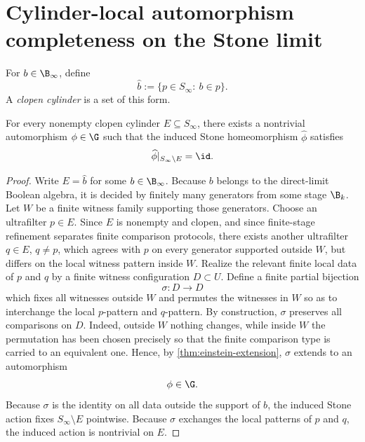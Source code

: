 \section{Cylinder-local automorphism completeness on the Stone limit}
\label{sec:einstein-cylinder}
\begin{definition}
	For \(b\in \B_\infty\), define
	\[
		\widehat b:=\{p\in S_\infty:\ b\in p\}.
	\]
	A \emph{clopen cylinder} is a set of this form.
\end{definition}
\begin{theorem}
	\label{thm:einstein-cylinder}
	For every nonempty clopen cylinder \(E\subseteq S_\infty\), there
	exists a nontrivial automorphism \(\phi\in\G\) such that the induced
	Stone homeomorphism \(\widehat\phi\) satisfies
	\[
		\widehat\phi|_{S_\infty\setminus E}=\id.
	\]
\end{theorem}
\begin{proof}
	Write \(E=\widehat b\) for some \(b\in \B_\infty\).
	Because \(b\) belongs to the direct-limit Boolean algebra, it is
	decided by finitely many generators from some stage \(\B_k\).
	Let \(W\) be a finite witness family supporting those generators.
	Choose an ultrafilter \(p\in E\).
	Since \(E\) is nonempty and clopen, and since finite-stage refinement
	separates finite comparison protocols, there exists another ultrafilter
	\(q\in E\), \(q\neq p\), which agrees with \(p\) on every generator
	supported outside \(W\), but differs on the local witness pattern
	inside \(W\).
	Realize the relevant finite local data of \(p\) and \(q\) by a finite
	witness configuration \(D\subset U\).
	Define a finite partial bijection
	\[
		\sigma:D\to D
	\]
	which fixes all witnesses outside \(W\) and permutes the witnesses in
	\(W\) so as to interchange the local \(p\)-pattern and \(q\)-pattern.
	By construction, \(\sigma\) preserves all comparisons on \(D\).
	Indeed, outside \(W\) nothing changes, while inside \(W\) the
	permutation has been chosen precisely so that the finite comparison
	type is carried to an equivalent one.
	Hence, by \cref{thm:einstein-extension}, \(\sigma\) extends to an
	automorphism
	\[
		\phi\in\G.
	\]
	Because \(\sigma\) is the identity on all data outside the support of
	\(b\), the induced Stone action fixes \(S_\infty\setminus E\)
	pointwise.
	Because \(\sigma\) exchanges the local patterns of \(p\) and \(q\), the
	induced action is nontrivial on \(E\).
\end{proof}
